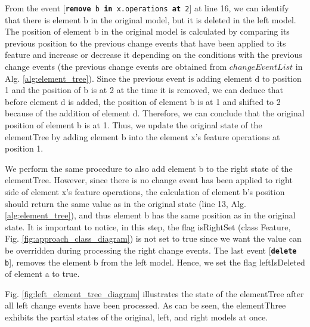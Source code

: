 \documentclass{jot}
\begin{document}
From the event [\texttt{\small \textbf{remove} b \textbf{in} x.operations \textbf{at} 2}] at line 16, we can identify that there is element \textsf{b} in the original model, but it is deleted in the left model. The position of element \textsf{b} in the original model is calculated by comparing its previous position to the previous change events that have been applied to its feature and increase or decrease it depending on the conditions with the previous change events (the previous change events are obtained from $changeEventList$ in Alg. \ref{alg:element_tree}). Since the previous event is adding element \textsf{d} to position 1 and the position of \textsf{b} is at 2 at the time it is removed, we can deduce that before element \textsf{d} is added, the position of element \textsf{b} is at 1 and shifted to 2 because of the addition of element \textsf{d}.  Therefore, we can conclude that the original position of element \textsf{b} is at 1. Thus, we update the original state of the \textsf{elementTree} by adding element \textsf{b} into the element \textsf{x}'s feature \textsf{operations} at position 1.  

We perform the same procedure to also add element \textsf{b} to the right state of the \textsf{elementTree}. However, since there is no change event has been applied to right side of element \textsf{x}'s feature \textsf{operations}, the calculation of element \textsf{b}'s position should return the same value as in the original state (line 13, Alg. \ref{alg:element_tree}), and thus element \textsf{b} has the same position as in the original state. It is important to notice, in this step, the flag \textsf{isRightSet} (class \textsf{Feature}, Fig. \ref{fig:approach_class_diagram}) is not set to \textsf{true} since we want the value can be overridden during processing the right change events. The last event [\texttt{\small \textbf{delete} b}], removes the element \textsf{b} from the left model. Hence, we set the flag \textsf{leftIsDeleted} of element \textsf{a} to \textsf{true}.

Fig. \ref{fig:left_element_tree_diagram} illustrates the state of the \textsf{elementTree} after all left change events have been processed. As can be seen, the \textsf{elementThree} exhibits the partial states of the original, left, and right models at once. 
\end{document}
